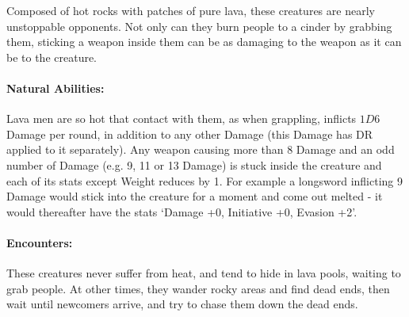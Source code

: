 \begin{multicols}{2}
\archmage

\label{lavaman}

Composed of hot rocks with patches of pure lava, these creatures are nearly unstoppable opponents.  Not only can they burn people to a cinder by grabbing them, sticking a weapon inside them can be as damaging to the weapon as it can be to the creature.

\paragraph{Natural Abilities:} Lava men are so hot that contact with them, as when grappling, inflicts $1D6$ Damage per round, in addition to any other Damage (this Damage has DR applied to it separately).  Any weapon causing more than 8 Damage and an odd number of Damage (e.g. 9, 11 or 13 Damage) is stuck inside the creature and each of its stats except Weight reduces by 1.  For example a longsword inflicting 9 Damage would stick into the creature for a moment and come out melted - it would thereafter have the stats `Damage +0, Initiative +0, Evasion +2'.

\paragraph{Encounters:} These creatures never suffer from heat, and tend to hide in lava pools, waiting to grab people.
At other times, they wander rocky areas and find dead ends, then wait until newcomers arrive, and try to chase them down the dead ends.

\lavaman

\end{multicols}
